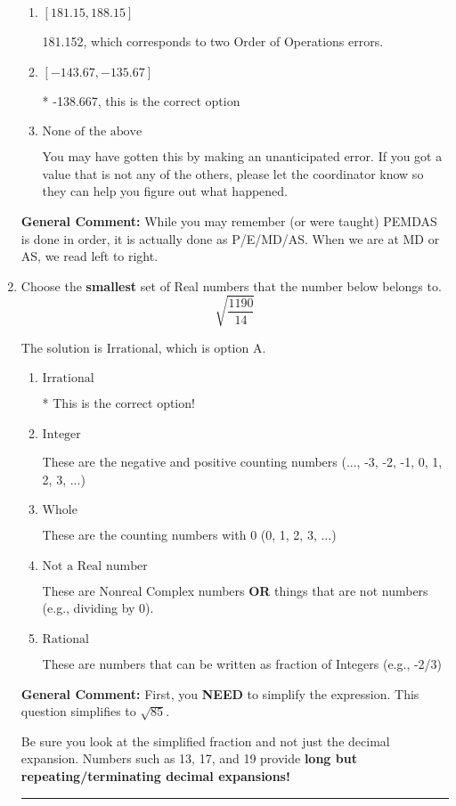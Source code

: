 \documentclass{extbook}[14pt]
\newcommand{\litem}[1]{\item #1

\rule{\textwidth}{0.4pt}}
\begin{document}
\begin{enumerate}
{\begin{enumerate}[label=\Alph*.]
 -156.848, which corresponds to an Order of Operations error: not reading left-to-right for multiplication/division.
\item \( [181.15, 188.15] \)

 181.152, which corresponds to two Order of Operations errors.
\item \( [-143.67, -135.67] \)

* -138.667, this is the correct option
\item \( \text{None of the above} \)

 You may have gotten this by making an unanticipated error. If you got a value that is not any of the others, please let the coordinator know so they can help you figure out what happened.
\end{enumerate}

\textbf{General Comment:} While you may remember (or were taught) PEMDAS is done in order, it is actually done as P/E/MD/AS. When we are at MD or AS, we read left to right.
}
\litem{
Choose the \textbf{smallest} set of Real numbers that the number below belongs to.
\[ \sqrt{\frac{1190}{14}} \]

The solution is \( \text{Irrational} \), which is option A.\begin{enumerate}[label=\Alph*.]
\item \( \text{Irrational} \)

* This is the correct option!
\item \( \text{Integer} \)

These are the negative and positive counting numbers (..., -3, -2, -1, 0, 1, 2, 3, ...)
\item \( \text{Whole} \)

These are the counting numbers with 0 (0, 1, 2, 3, ...)
\item \( \text{Not a Real number} \)

These are Nonreal Complex numbers \textbf{OR} things that are not numbers (e.g., dividing by 0).
\item \( \text{Rational} \)

These are numbers that can be written as fraction of Integers (e.g., -2/3)
\end{enumerate}

\textbf{General Comment:} First, you \textbf{NEED} to simplify the expression. This question simplifies to $\sqrt{85}$. 
 
 Be sure you look at the simplified fraction and not just the decimal expansion. Numbers such as 13, 17, and 19 provide \textbf{long but repeating/terminating decimal expansions!} 
 
}
\end{enumerate}
\end{document}
